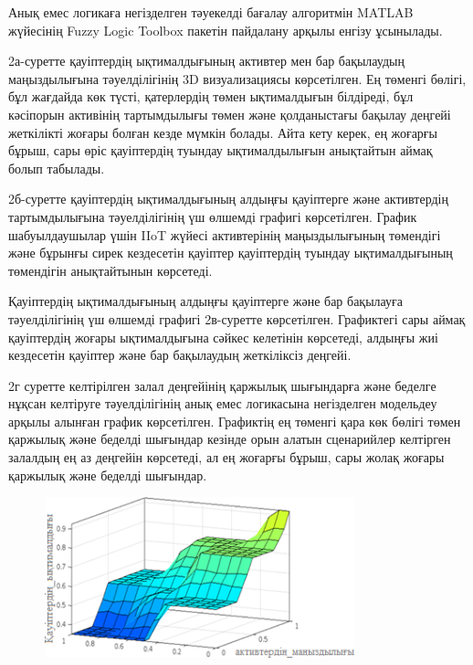 \begin{multicols}{2}
Анық емес логикаға негізделген тәуекелді бағалау алгоритмін MATLAB
жүйесінің Fuzzy Logic Toolbox пакетін пайдалану арқылы енгізу ұсынылады.

2а-суретте қауіптердің ықтималдығының активтер мен бар бақылаудың
маңыздылығына тәуелділігінің 3D визуализациясы көрсетілген. Ең төменгі
бөлігі, бұл жағдайда көк түсті, қатерлердің төмен ықтималдығын
білдіреді, бұл кәсіпорын активінің тартымдылығы төмен және қолданыстағы
бақылау деңгейі жеткілікті жоғары болған кезде мүмкін болады. Айта кету
керек, ең жоғарғы бұрыш, сары өріс қауіптердің туындау ықтималдылығын
анықтайтын аймақ болып табылады.

2б-суретте қауіптердің ықтималдығының алдыңғы қауіптерге және
активтердің тартымдылығына тәуелділігінің үш өлшемді графигі
көрсетілген. График шабуылдаушылар үшін IIoT жүйесі активтерінің
маңыздылығының төмендігі және бұрынғы сирек кездесетін қауіптер
қауіптердің туындау ықтималдығының төмендігін анықтайтынын көрсетеді.

Қауіптердің ықтималдығының алдыңғы қауіптерге және бар бақылауға
тәуелділігінің үш өлшемді графигі 2в-суретте көрсетілген. Графиктегі
сары аймақ қауіптердің жоғары ықтималдығына сәйкес келетінін көрсетеді,
алдыңғы жиі кездесетін қауіптер және бар бақылаудың жеткіліксіз деңгейі.

2г суретте келтірілген залал деңгейінің қаржылық шығындарға және беделге
нұқсан келтіруге тәуелділігінің анық емес логикасына негізделген
модельдеу арқылы алынған график көрсетілген. Графиктің ең төменгі қара
көк бөлігі төмен қаржылық және беделді шығындар кезінде орын алатын
сценарийлер келтірген залалдың ең аз деңгейін көрсетеді, ал ең жоғарғы
бұрыш, сары жолақ жоғары қаржылық және беделді шығындар.
\end{multicols}

\begin{figure}[H]
	\centering
	\includegraphics[width=0.8\textwidth]{media/ict/image27}
	\caption*{}
\end{figure}



